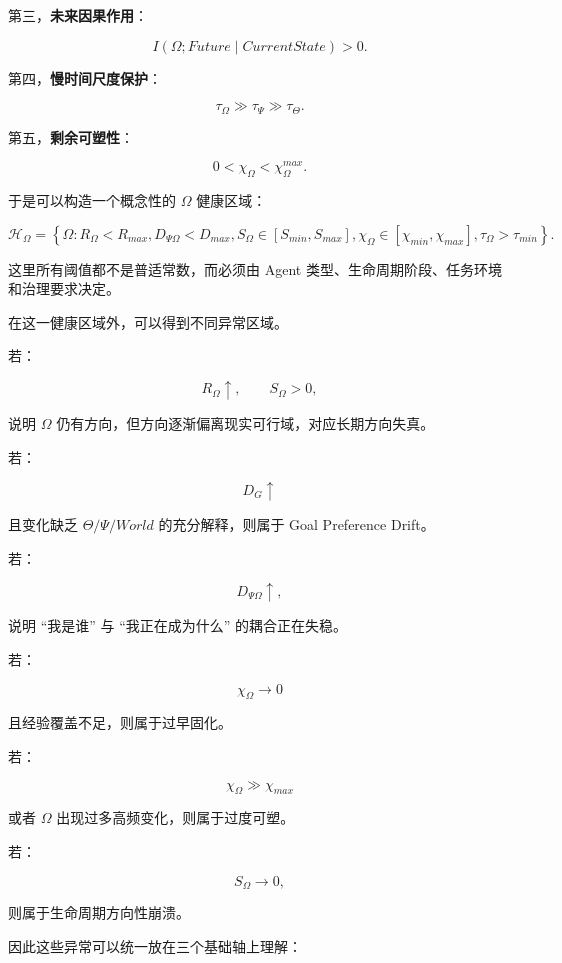 第三，\textbf{未来因果作用}：

\[
I(\Omega;Future\mid CurrentState)>0.
\]

第四，\textbf{慢时间尺度保护}：

\[
\tau_\Omega
\gg
\tau_\Psi
\gg
\tau_\Theta.
\]

第五，\textbf{剩余可塑性}：

\[
0<
\chi_\Omega
<
\chi_\Omega^{max}.
\]

于是可以构造一个概念性的 $\Omega$ 健康区域：

\[
\mathcal H_\Omega
=
\left\{
\Omega:
R_\Omega<R_{max},
D_{\Psi\Omega}<D_{max},
S_\Omega\in[S_{min},S_{max}],
\chi_\Omega\in[\chi_{min},\chi_{max}],
\tau_\Omega>\tau_{min}
\right\}.
\]

这里所有阈值都不是普适常数，而必须由 Agent 类型、生命周期阶段、任务环境和治理要求决定。

在这一健康区域外，可以得到不同异常区域。

若：

\[
R_\Omega\uparrow,
\qquad
S_\Omega>0,
\]

说明 $\Omega$ 仍有方向，但方向逐渐偏离现实可行域，对应长期方向失真。

若：

\[
D_G\uparrow
\]

且变化缺乏 $\Theta/\Psi/World$ 的充分解释，则属于 Goal Preference Drift。

若：

\[
D_{\Psi\Omega}\uparrow,
\]

说明 ``我是谁'' 与 ``我正在成为什么'' 的耦合正在失稳。

若：

\[
\chi_\Omega\rightarrow0
\]

且经验覆盖不足，则属于过早固化。

若：

\[
\chi_\Omega\gg\chi_{max}
\]

或者 $\Omega$ 出现过多高频变化，则属于过度可塑。

若：

\[
S_\Omega\rightarrow0,
\]

则属于生命周期方向性崩溃。

因此这些异常可以统一放在三个基础轴上理解：

\begin{statementbox}
\centering
{}
\end{statementbox}

